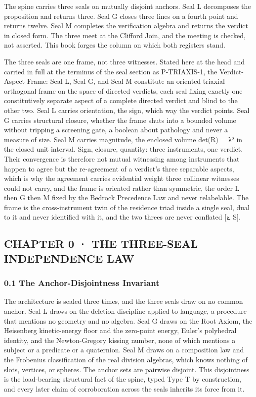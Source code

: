 \documentclass[10pt,twocolumn]{article}
\begin{document}
The spine carries three seals on mutually disjoint anchors. Seal L
decomposes the proposition and returns three. Seal G closes three lines
on a fourth point and returns twelve. Seal M completes the verification
algebra and returns the verdict in closed form. The three meet at the
Clifford Join, and the meeting is checked, not asserted. This book
forges the column on which both registers stand.

The three seals are one frame, not three witnesses. Stated here at the
head and carried in full at the terminus of the seal section as
P-TRIAXIS-1, the Verdict-Aspect Frame: Seal L, Seal G, and Seal M
constitute an oriented triaxial orthogonal frame on the space of
directed verdicts, each seal fixing exactly one constitutively separate
aspect of a complete directed verdict and blind to the other two. Seal L
carries orientation, the sign, which way the verdict points. Seal G
carries structural closure, whether the frame shuts into a bounded
volume without tripping a screening gate, a boolean about pathology and
never a measure of size. Seal M carries magnitude, the enclosed volume
det(R) = λ² in the closed unit interval. Sign, closure, quantity: three
instruments, one verdict. Their convergence is therefore not mutual
witnessing among instruments that happen to agree but the re-agreement
of a verdict's three separable aspects, which is why the agreement
carries evidential weight three collinear witnesses could not carry, and
the frame is oriented rather than symmetric, the order L then G then M
fixed by the Bedrock Precedence Law and never relabelable. The frame is
the cross-instrument twin of the residence triad inside a single seal,
dual to it and never identified with it, and the two threes are never
conflated {[}⟀ S{]}.

\hypertarget{chapter-0-the-three-seal-independence-law}{%
\subsection{CHAPTER 0 · THE THREE-SEAL INDEPENDENCE
LAW}\label{chapter-0-the-three-seal-independence-law}}

\hypertarget{the-anchor-disjointness-invariant}{%
\subsubsection{0.1 The Anchor-Disjointness
Invariant}\label{the-anchor-disjointness-invariant}}

The architecture is sealed three times, and the three seals draw on no
common anchor. Seal L draws on the deletion discipline applied to
language, a procedure that mentions no geometry and no algebra. Seal G
draws on the Root Axiom, the Heisenberg kinetic-energy floor and the
zero-point energy, Euler's polyhedral identity, and the Newton-Gregory
kissing number, none of which mentions a subject or a predicate or a
quaternion. Seal M draws on a composition law and the Frobenius
classification of the real division algebras, which knows nothing of
slots, vertices, or spheres. The anchor sets are pairwise disjoint. This
disjointness is the load-bearing structural fact of the spine, typed
Type T by construction, and every later claim of corroboration across
the seals inherits its force from it.
\end{document}
